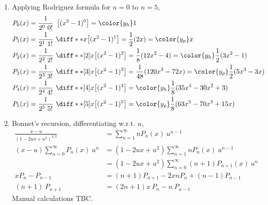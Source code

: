 \begin{enumerate}
    \item Applying Rodriguez formula for $ n = 0 $ to $ n = 5 $,
          \begin{align}
              P_0 (x) & = \frac{1}{2^0\ 0!}\ \left[ (x^2 - 1)^0 \right]
              = {\color{y_h} 1}                                         \\
              P_1 (x) & = \frac{1}{2^1\ 1!}\ \diff**{x}
              {\left[ (x^2 - 1)^1 \right]}
              = \frac{1}{2} (2x)
              = {\color{y_p} x}                                         \\
              P_2 (x) & = \frac{1}{2^2\ 2!}\ \diff**[2]{x}
              {\left[ (x^2 - 1)^2 \right]}
              = \frac{1}{8} (12x^2 - 4)
              =  {\color{y_h} \frac{1}{2}(3x^2 - 1)}                    \\
              P_3 (x) & = \frac{1}{2^3\ 3!}\ \diff**[3]{x}
              {\left[ (x^2 - 1)^3 \right]}
              = \frac{1}{48} (120x^3 - 72x)
              =  {\color{y_p} \frac{1}{2}(5x^3 - 3x)}                   \\
              P_4 (x) & = \frac{1}{2^4\ 4!}\ \diff**[4]{x}
              {\left[ (x^2 - 1)^4 \right]}
              = {\color{y_h} \frac{1}{8}(35x^4 - 30x^2 + 3)}            \\
              P_5 (x) & = \frac{1}{2^5\ 5!}\ \diff**[5]{x}
              {\left[ (x^2 - 1)^5 \right]}
              =  {\color{y_p} \frac{1}{8}(63x^5 - 70x^3 + 15x)}
          \end{align}

    \item Bonnet's recursion, differentiating w.r.t. $ u $,
          \begin{align}
              \frac{x - u}{(1 - 2ux + u^2)^{3/2}}   & = \sum_{n = 1}^{\infty}
              n P_n(x)\ u^{n-1}                                               \\
              (x-u) \sum_{n=0}^{\infty} P_n(x)\ u^n &
              = (1 - 2ux + u^2)\sum_{n = 1}^{\infty} n P_n(x)\ u^{n-1}        \\
                                                    &
              = (1 - 2ux + u^2)\sum_{n = 0}^{\infty} (n+1) P_{n+1}(x)\ u^{n}  \\
              xP_n - P_{n-1}                        &
              = (n+1)P_{n+1} - 2xn P_n + (n-1)P_{n-1}                         \\
              (n+1)\ P_{n+1}                        &
              = (2n + 1)x\ P_n - n\ P_{n-1}
          \end{align}
          Manual calculations TBC.


\end{enumerate}
